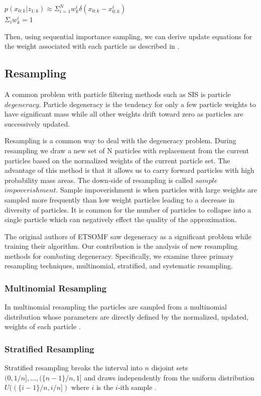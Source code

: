 \documentclass{article}
\begin{document}
\begin{center}
    $p(x_{0:k}| z_{1:k}) \approx \Sigma_{i=1}^{N}w^i_k \delta(x_{0:k} - x^i_{0:k})$ \\
      $\Sigma_i w_k^i = 1$ \\
\end{center}

Then, using sequential importance sampling, we can derive update equations for the weight associated with each particle as described in \cite{arulampalam2002tutorial}.

\subsection{Resampling}
A common problem with particle filtering methods such as SIS is particle $degeneracy$. Particle degeneracy is the tendency for only a few particle weights to have significant mass while all other weights drift toward zero as particles are successively updated.

Resampling is a common way to deal with the degeneracy problem. During resampling we draw a new set of N particles with replacement from the current particles based on the normalized weights of the current particle set. The advantage of this method is that it allows us to carry forward particles with high probability mass areas. The down-side of resampling is called $sample$ $impoverishment$. Sample impoverishment is when particles with large weights are sampled more frequently than low weight particles leading to a decrease in diversity of particles. It is common for the number of particles to collapse into a single particle which can negatively effect the quality of the approximation.

The original authors of ETSOMF saw degeneracy as a significant problem while training their algorithm. Our contribution is the analysis of new resampling methods for combating degeneracy. Specifically, we examine three primary resampling techniques, multinomial, stratified, and systematic resampling.

\subsubsection{Multinomial Resampling}
In multinomial resampling the particles are sampled from a multinomial distribution whose parameters are directly defined by the normalized, updated, weights of each particle \cite{douc2005comparison}.

\subsubsection{Stratified Resampling}
Stratified resampling breaks the interval into $n$ disjoint sets $(0, 1/n], ... , (\{n - 1\} / n, 1]$ and draws independently from the uniform distribution $U((\{i - 1\}/n, i/n])$ where $i$ is the $i$-ith sample \cite{douc2005comparison}.
\end{document}
